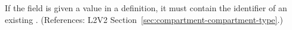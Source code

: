 If the  field is given a value in a \Compartment
definition, it must contain the identifier of an existing \CompartmentType.
(References: L2V2 Section~\ref{sec:compartment-compartment-type}.)

